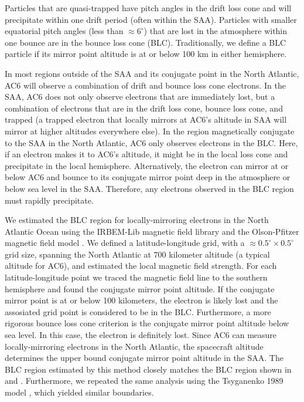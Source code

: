 \documentclass[draft]{agujournal2019}
\begin{document}
Particles that are quasi-trapped have pitch angles in the drift loss cone and will precipitate within one drift period (often within the SAA). Particles with smaller equatorial pitch angles (less than $\approx 6^\circ$) that are lost in the atmosphere within one bounce are in the bounce loss cone (BLC). Traditionally, we define a BLC particle if its mirror point altitude is at or below 100 km in either hemisphere.

In most regions outside of the SAA and its conjugate point in the North Atlantic, AC6 will observe a combination of drift and bounce loss cone electrons. In the SAA, AC6 does not only observe electrons that are immediately lost, but a combination of electrons that are in the drift loss cone, bounce loss cone, and trapped (a trapped electron that locally mirrors at AC6's altitude in SAA will mirror at higher altitudes everywhere else). In the region magnetically conjugate to the SAA in the North Atlantic, AC6 only observes electrons in the BLC. Here, if an electron makes it to AC6's altitude, it might be in the local loss cone and precipitate in the local hemisphere. Alternatively, the electron can mirror at or below AC6 and bounce to its conjugate mirror point deep in the atmosphere or below sea level in the SAA. Therefore, any electrons observed in the BLC region must rapidly precipitate. 

We estimated the BLC region for locally-mirroring electrons in the North Atlantic Ocean using the IRBEM-Lib magnetic field library and the Olson-Pfitzer magnetic field model \cite{irbem, Olson1982}. We defined a latitude-longitude grid, with a $\approx 0.5^\circ \times 0.5^\circ$ grid size, spanning the North Atlantic at 700 kilometer altitude (a typical altitude for AC6), and estimated the local magnetic field strength. For each latitude-longitude point we traced the magnetic field line to the southern hemisphere and found the conjugate mirror point altitude. If the conjugate mirror point is at or below 100 kilometers, the electron is likely lost and the assosiated grid point is considered to be in the BLC. Furthermore, a more rigorous bounce loss cone criterion is the conjugate mirror point altitude below sea level. In this case, the electron is definitely lost. Since AC6 can measure locally-mirroring electrons in the North Atlantic, the spacecraft altitude determines the upper bound conjugate mirror point altitude in the SAA. The BLC region estimated by this method closely matches the BLC region shown in  and . Furthermore, we repeated the same analysis using the Tsyganenko 1989 model \cite{Tsyganenko1989}, which yielded similar boundaries.
\end{document}
